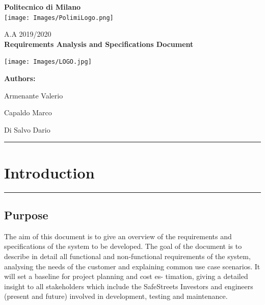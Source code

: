 \documentclass[12pt]{article}
\begin{document}
\onehalfspacing
\begin{center}
	{\huge {\textbf{Politecnico di Milano}}}
	 	\vspace{7mm}\\
	 	
 	 	\texttt{[image: Images/PolimiLogo.png]}
	\end{center}

\begin{center}
	     \vspace{5mm}
		{\Large A.A 2019/2020} 
		\vspace{5mm}\\
		{\Large {\textbf{Requirements Analysis and Specifications Document}}}   
		 
		\texttt{[image: Images/LOGO.jpg]}
    \end{center}
          
\begin{flushright}
         
	 	 
	 	{\huge {\Large \textbf{Authors:}}}
	 	 
	 	{Armenante Valerio}
	 	
	 	{Capaldo Marco}
	 	
	 	{Di Salvo Dario}
	\end{flushright}



\newpage
\hrule
\hypersetup{hidelinks}\tableofcontents

\vspace{0.5mm}
\vspace{0.24mm}

\newpage

\section{Introduction}
\hrule
\vspace{8mm}
\subsection{Purpose}
\vspace{5mm}
       The aim of this document is to give an overview of the             requirements and specifications of the system to be developed. The goal of the document is to describe in detail all functional and non-functional requirements of the system, analysing the needs of the customer and explaining common use case scenarios. It will set a baseline for project planning and cost es- timation, giving a detailed insight to all stakeholders which include the SafeStreets Investors and engineers (present and future) involved in development, testing and maintenance. 
\end{document}
